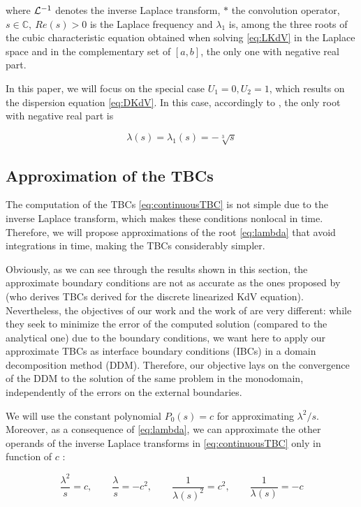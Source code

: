 \noindent where $\mathcal{L}^{-1}$ denotes the inverse Laplace transform, $*$ the convolution operator, $s \in \mathbb{C}, \ Re(s)>0$ is the Laplace frequency and $\lambda_1$ is, among the three roots of the cubic characteristic equation obtained when solving \eqref{eq:LKdV} in the Laplace space and in the complementary set of $[a,b]$, the only one with negative real part.

\indent In this paper, we will focus on the special case $U_1 = 0, U_2 = 1$, which results on the dispersion equation \eqref{eq:DKdV}. In this case, accordingly to \cite{zheng2008}, the only root with negative real part is 

\begin{equation}
	\label{eq:lambda}
			\lambda(s) = \lambda_1(s) =  -\sqrt[3]{s} 
\end{equation}

\subsection{Approximation of the TBCs}

\indent The computation of the TBCs \eqref{eq:continuousTBC} is not simple due to the inverse Laplace transform, which makes these conditions nonlocal in time. Therefore, we will propose approximations of the root \eqref{eq:lambda} that avoid integrations in time, making the TBCs considerably simpler.

\indent Obviously, as we can see through the results shown in this section, the approximate boundary conditions are not as accurate as the ones proposed by \cite{besse2015} (who derives TBCs derived for the discrete linearized KdV equation). Nevertheless, the objectives of our work and the work of \cite{besse2015} are very different: while they seek to minimize the error of the computed solution (compared to the analytical one) due to the boundary conditions, we want here to apply our approximate TBCs as interface boundary conditions (IBCs) in a domain decomposition method (DDM). Therefore, our objective lays on the convergence of the DDM to the solution of the same problem in the monodomain, independently of the errors on the external boundaries. 

\indent We will use the constant polynomial $P_0(s) = c$ for approximating $\lambda^2/s$. Moreover, as a consequence of \eqref{eq:lambda}, we can approximate the other operands of the inverse Laplace transforms in \eqref{eq:continuousTBC} only in function of $c$ :

\begin{equation}
	\label{eq:appP0}
	\frac{\lambda^2}{s}  = c, \qquad
	\frac{\lambda}{s}  = -c^2, \qquad
	\frac{1}{\lambda(s)^2}  = c^2, \qquad 
	 \frac{1}{\lambda(s)}  = -c 
\end{equation}

